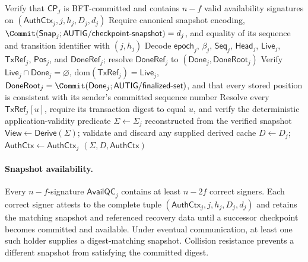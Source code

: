 \begin{algorithm}[h!]
\caption{\textsc{RecoverState}: Checkpoint Recovery and Committed Replay}
\label{alg:recover-state}
\footnotesize
{}
Verify that $\mathsf{CP}_j$ is BFT-committed and contains $n-f$ valid
availability signatures on $(\mathsf{AuthCtx}_j,j,h_j,D_j,d_j)$\;
Require canonical snapshot encoding,
$\Commit(\mathsf{Snap}_j;\mathsf{AUTIG/checkpoint\mbox{-}snapshot})=d_j$,
and equality of its sequence and transition identifier with $(j,h_j)$\;
Decode $\mathsf{epoch}_j$, $\beta_j$, $\mathsf{Seq}_j$,
$\mathsf{Head}_j$, $\mathsf{Live}_j$, $\mathsf{TxRef}_j$,
$\mathsf{Pos}_j$, and $\mathsf{DoneRef}_j$;
resolve $\mathsf{DoneRef}_j$ to
$(\mathsf{Done}_j,\mathsf{DoneRoot}_j)$\;
Verify $\mathsf{Live}_j\cap\mathsf{Done}_j=\varnothing$,
$\mathrm{dom}(\mathsf{TxRef}_j)=\mathsf{Live}_j$,
$\mathsf{DoneRoot}_j=\Commit(\mathsf{Done}_j;
\mathsf{AUTIG/finalized\mbox{-}set})$, and that every stored position is
consistent with its sender's committed sequence number\;
Resolve every $\mathsf{TxRef}_j[u]$, require its transaction digest to equal
$u$, and verify the deterministic application-validity predicate\;
$\Sigma\gets\Sigma_j$ reconstructed from the verified snapshot\;
$\mathsf{View}\gets\mathsf{Derive}(\Sigma)$; validate and discard any supplied
derived cache\;
$D\gets D_j$; $\mathsf{AuthCtx}\gets\mathsf{AuthCtx}_j$\;
\KwRet $(\Sigma,D,\mathsf{AuthCtx})$
\end{algorithm}

\paragraph{Snapshot availability.}
Every $n-f$-signature $\mathsf{AvailQC}_j$ contains at least $n-2f$ correct
signers.  Each correct signer attests to the complete tuple
$(\mathsf{AuthCtx}_j,j,h_j,D_j,d_j)$ and retains the matching snapshot and referenced
recovery data until a successor checkpoint becomes committed and available.  Under
eventual communication,
at least one such holder supplies a digest-matching snapshot.  Collision
resistance prevents a different snapshot from satisfying the committed
digest.

